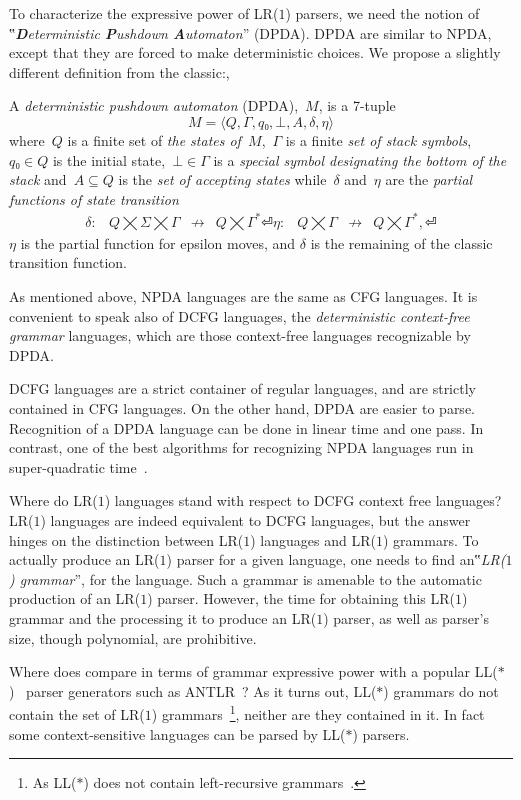 To characterize the expressive power of LR($1$) parsers, we need the notion
of ‟\emph{\textbf Deterministic \textbf Pushdown \textbf Automaton}” (DPDA).
DPDA are similar to NPDA, except that they are forced
  to make deterministic choices.
We propose a slightly different definition from the classic:,
\begin{Definition}
  \label{Definition:DPDA}
  A \emph{deterministic pushdown automaton} (DPDA),~$M$, is a 7-tuple
  \[
    M =⟨Q,Γ, q₀,⊥, A,δ,η⟩
  \]
  where~$Q$ is a finite set of
  \emph{the states of~$M$},~$Γ$ is a finite
  \emph{set of stack symbols},~$q₀∈Q$ is the initial state,~$⊥∈Γ$
  is a \emph{special symbol designating the bottom of the stack}
  and~$A⊆Q$ is the \emph{set of accepting states} while~$δ$ and~$η$ are
  the \emph{partial functions of state transition}
  \[
    \begin{array}{crlc}
      δ: & Q⨉Σ⨉Γ &↛& Q⨉Γ^*⏎
      η: & Q⨉Γ &↛& Q⨉Γ^*,⏎
    \end{array}
  \]
  $η$ is the partial function for epsilon moves, and $δ$ is the remaining of the classic transition function.
\end{Definition}

As mentioned above, NPDA languages are the same as CFG languages.
It is convenient to speak also of DCFG languages, the \emph{deterministic context-free grammar} languages,
  which are those context-free languages recognizable by DPDA.

DCFG languages are a strict container of regular languages, 
  and are strictly contained in CFG languages.
  On the other hand, DPDA are easier to parse.
Recognition of a DPDA language can be done in linear time and one pass.
  In contrast, one of the best algorithms for recognizing NPDA languages run in super-quadratic time~\cite{Younger:1967,Cocke:1969,Earley:1970}.

Where do LR($1$) languages stand with respect to DCFG context free languages?
LR($1$) languages are indeed equivalent to DCFG languages, but
the answer hinges on the distinction
  between LR($1$) languages and LR($1$) grammars.
To actually produce an LR($1$) parser for a given language,
  one needs to find an‟\emph{LR($1$) grammar}”, for the language.
Such a grammar is amenable to
  the automatic production of an LR($1$) parser.
However, the time for obtaining this LR($1$) grammar and the processing it to produce an LR($1$) parser,
  as well as parser's size,
  though polynomial, are prohibitive.

Where does \Self compare in terms of grammar expressive power with a popular LL($*$)~\cite{Parr:2011} parser generators such %
  as ANTLR~\cite{Parr:1995}?
  As it turns out, LL($*$) grammars do not contain the set of LR($1$) grammars~\footnote{As LL($*$) does not contain left-recursive grammars~\cite{Parr:2011}.}, 
neither are they contained in it. 
  In fact some context-sensitive languages can be parsed by LL($*$) parsers.